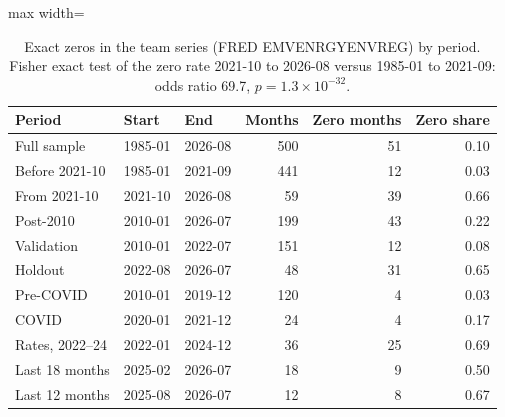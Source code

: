 \begin{table}[H]
\centering\small
\caption{Exact zeros in the team series (FRED EMVENRGYENVREG) by period. Fisher exact test of the zero rate 2021-10 to 2026-08 versus 1985-01 to 2021-09: odds ratio 69.7, $p=1.3\times10^{-32}$.}
\label{tab:m1_zeros}
\begin{adjustbox}{max width=\linewidth}
\begin{tabular}{lllrrr}
\toprule
Period & Start & End & Months & Zero months & Zero share \\
\midrule
Full sample & 1985-01 & 2026-08 & 500 & 51 & 0.10 \\
Before 2021-10 & 1985-01 & 2021-09 & 441 & 12 & 0.03 \\
From 2021-10 & 2021-10 & 2026-08 & 59 & 39 & 0.66 \\
Post-2010 & 2010-01 & 2026-07 & 199 & 43 & 0.22 \\
Validation & 2010-01 & 2022-07 & 151 & 12 & 0.08 \\
Holdout & 2022-08 & 2026-07 & 48 & 31 & 0.65 \\
Pre-COVID & 2010-01 & 2019-12 & 120 & 4 & 0.03 \\
COVID & 2020-01 & 2021-12 & 24 & 4 & 0.17 \\
Rates, 2022--24 & 2022-01 & 2024-12 & 36 & 25 & 0.69 \\
Last 18 months & 2025-02 & 2026-07 & 18 & 9 & 0.50 \\
Last 12 months & 2025-08 & 2026-07 & 12 & 8 & 0.67 \\
\bottomrule
\end{tabular}
\end{adjustbox}
\end{table}
